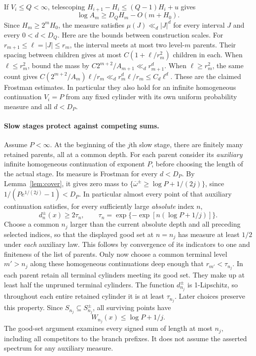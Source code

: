 \documentclass[11pt]{article}
\newcommand{\upexp}{\overline\omega}
\begin{document}
If $V_i\le Q<\infty$, telescoping $H_{i+1}-H_i\le(Q-1)H_i+u$ gives
\[
 \log A_m\ge D_Q H_m-O(m+H_0).
\]
Since $H_m\ge2^m H_0$, the measure satisfies $\mu(J)\ll_d |J|^d$ for every interval $J$ and every $0<d<D_Q$. Here are the bounds between construction scales. For $r_{m+1}\le\ell=|J|\le r_m$, the interval meets at most two level-$m$ parents. Their spacing between children gives at most $C(1+\ell/r_m^2)$ children in each. When $\ell\le r_m^2$, bound the mass by $C2^{m+2}/A_{m+1}\ll_d r_{m+1}^d$. When $\ell\ge r_m^2$, the same count gives $C(2^{m+2}/A_m)\ell/r_m\ll_d r_m^d\ell/r_m\le C_d\ell^d$. These are the claimed Frostman estimates. In particular they also hold for an infinite homogeneous continuation $V_i=P$ from any fixed cylinder with its own uniform probability measure and all $d<D_P$.

\paragraph{Slow stages protect against competing sums.}
Assume $P<\infty$. At the beginning of the $j$th slow stage, there are finitely many retained parents, all at a common depth. For each parent consider its \emph{auxiliary} infinite homogeneous continuation of exponent $P$, before choosing the length of the actual stage. Its measure is Frostman for every $d<D_P$. By Lemma~\ref{lem:cover}, it gives zero mass to $\{\upexp^\pm\ge\log P+1/(2j)\}$, since $1/(P e^{1/(2j)}-1)<D_P$. In particular almost every point of that auxiliary continuation satisfies, for every sufficiently large \emph{absolute} index $n$,
\[
 d_n^\pm(x)\ge 2 \tau_n,\qquad
 \tau_n=\exp\{-\exp[n(\log P+1/j)]\}.
\]
Choose a common $n_j$ larger than the current absolute depth and all preceding selected indices, so that the displayed good set at $n=n_j$ has measure at least $1/2$ under \emph{each} auxiliary law. This follows by convergence of its indicators to one and finiteness of the list of parents. Only now choose a common terminal level $m'>n_j$ along these homogeneous continuations deep enough that $r_{m'}<\tau_{n_j}$. In each parent retain all terminal cylinders meeting its good set. They make up at least half the unpruned terminal cylinders. The function $d_{n_j}^\pm$ is 1-Lipschitz, so throughout each entire retained cylinder it is at least $\tau_{n_j}$. Later choices preserve this property. Since $S_{n_j}\subseteq S_{n_j}^\pm$, all surviving points have
\begin{equation}\label{protect}
 W_{n_j}(x)\le\log P+1/j.
\end{equation}
The good-set argument examines every signed sum of length at most $n_j$, including all competitors to the branch prefixes. It does not assume the asserted spectrum for any auxiliary measure.
\end{document}
